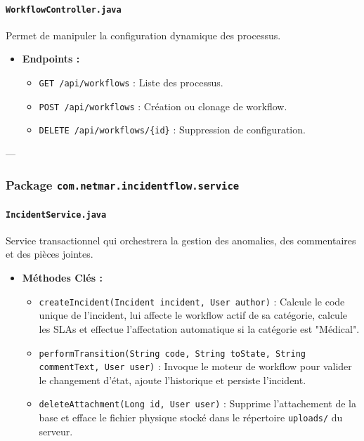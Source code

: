 \documentclass[12pt,a4paper]{article}
\begin{document}
\paragraph{\texttt{WorkflowController.java}}
Permet de manipuler la configuration dynamique des processus.
\begin{itemize}
    \item \textbf{Endpoints :}
        \begin{itemize}
            \item \texttt{GET /api/workflows} : Liste des processus.
            \item \texttt{POST /api/workflows} : Création ou clonage de workflow.
            \item \texttt{DELETE /api/workflows/\{id\}} : Suppression de configuration.
        \end{itemize}
\end{itemize}

---

\subsubsection{Package \texttt{com.netmar.incidentflow.service}}

\paragraph{\texttt{IncidentService.java}}
Service transactionnel qui orchestrera la gestion des anomalies, des commentaires et des pièces jointes.
\begin{itemize}
    \item \textbf{Méthodes Clés :}
        \begin{itemize}
            \item \texttt{createIncident(Incident incident, User author)} : Calcule le code unique de l'incident, lui affecte le workflow actif de sa catégorie, calcule les SLAs et effectue l'affectation automatique si la catégorie est "Médical".
            \item \texttt{performTransition(String code, String toState, String commentText, User user)} : Invoque le moteur de workflow pour valider le changement d'état, ajoute l'historique et persiste l'incident.
            \item \texttt{deleteAttachment(Long id, User user)} : Supprime l'attachement de la base et efface le fichier physique stocké dans le répertoire \texttt{uploads/} du serveur.
        \end{itemize}
\end{itemize}
\end{document}
